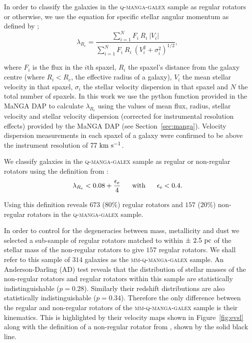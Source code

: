 \documentclass[useAMS,usenatbib]{mn2e}
\begin{document}
In order to classify the galaxies in the \textsc{q-manga-galex} sample as regular rotators or otherwise, we use the equation for specific stellar angular momentum as defined by \cite{emsellem07, emsellem11};
\begin{equation}
\lambda_{R_{e}} = \frac{\sum_{i=1}^{N} F_i\ R_i\ |V_i|}{\sum_{i=1}^{N} F_i\ R_i\ (V_i^2 + \sigma_i^2)^{1/2}},
\end{equation}	

where $F_i$ is the flux in the $i$th spaxel, $R_i$ the spaxel's distance from the galaxy centre (where $R_i < R_e$, the effective radius of a galaxy), $V_i$ the mean stellar velocity in that spaxel, $\sigma_i$ the stellar velocity dispersion in that spaxel and $N$ the total number of spaxels. In this work we use the python function provided in the MaNGA DAP to calculate $\lambda_{R_{e}}$ using the values of mean flux, radius, stellar velocity and stellar velocity dispersion (corrected for instrumental resolution effects) provided  by the MaNGA DAP (see Section~\ref{sec:manga}). Velocity dispersion measurements in each spaxel of a galaxy were confirmed to be above the instrument resolution of $77~\rm{km}~\rm{s}^{-1}$.

We classify galaxies in the \textsc{q-manga-galex} sample as regular or non-regular rotators using the definition from \cite{cappellari16}:
\begin{equation}
\lambda_{R_{e}} < 0.08 + \frac{\epsilon_e}{4} ~~~~~ \rm{with} ~~~~~ \epsilon_e < 0.4.
\end{equation}

Using this definition reveals $673$ ($80\%$) regular rotators and $157$ ($20\%$) non-regular rotators in the \textsc{q-manga-galex} sample. %

In order to control for the degeneracies between mass, metallicity and dust we selected a sub-sample of regular rotators matched to within $\pm~2.5~\rm{pc}$ of the stellar mass of the non-regular rotators to give $157$ regular rotators. We shall refer to this sample of $314$ galaxies as the \textsc{mm-q-manga-galex} sample. An Anderson-Darling (AD) test reveals that the distribution of stellar masses of the non-regular rotators and regular rotators within this sample are statistically indistinguishable ($p=0.28$). Similarly their redshift distributions are also statistically indistinguishable ($p=0.34$). Therefore the only difference between the regular and non-regular rotators of the \textsc{mm-q-manga-galex} sample is their kinematics. This is highlighted by their velocity maps shown in Figure~\ref{fig:evsl} along with the definition of a non-regular rotator from \cite{cappellari16}, shown by the solid black line. 
\end{document}
